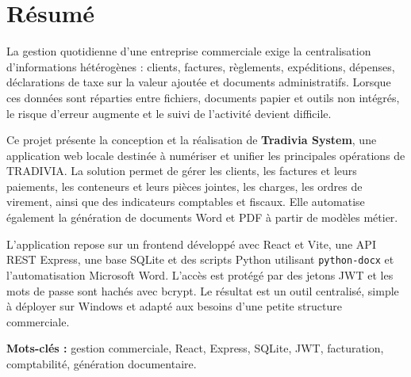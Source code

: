 \documentclass[12pt,a4paper,oneside]{report}
\newcommand{\code}[1]{\texttt{#1}}
\begin{document}
\chapter*{Résumé}
La gestion quotidienne d'une entreprise commerciale exige la centralisation d'informations hétérogènes : clients, factures, règlements, expéditions, dépenses, déclarations de taxe sur la valeur ajoutée et documents administratifs. Lorsque ces données sont réparties entre fichiers, documents papier et outils non intégrés, le risque d'erreur augmente et le suivi de l'activité devient difficile.

Ce projet présente la conception et la réalisation de \textbf{Tradivia System}, une application web locale destinée à numériser et unifier les principales opérations de TRADIVIA. La solution permet de gérer les clients, les factures et leurs paiements, les conteneurs et leurs pièces jointes, les charges, les ordres de virement, ainsi que des indicateurs comptables et fiscaux. Elle automatise également la génération de documents Word et PDF à partir de modèles métier.

L'application repose sur un frontend développé avec React et Vite, une API REST Express, une base SQLite et des scripts Python utilisant \code{python-docx} et l'automatisation Microsoft Word. L'accès est protégé par des jetons JWT et les mots de passe sont hachés avec bcrypt. Le résultat est un outil centralisé, simple à déployer sur Windows et adapté aux besoins d'une petite structure commerciale.

\textbf{Mots-clés :} gestion commerciale, React, Express, SQLite, JWT, facturation, comptabilité, génération documentaire.
\end{document}
